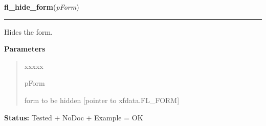     \label{xformslib:library:fl_hide_form}

    \vspace{0.5ex}

\hspace{.8\funcindent}\begin{boxedminipage}{\funcwidth}

    \raggedright \textbf{fl\_hide\_form}(\textit{pForm})

    \vspace{-1.5ex}

    \rule{\textwidth}{0.5\fboxrule}
\setlength{\parskip}{2ex}
    Hides the form.

\setlength{\parskip}{1ex}
      \textbf{Parameters}
      \vspace{-1ex}

      \begin{quote}
        \begin{Ventry}{xxxxx}

          \item[pForm]

          form to be hidden [pointer to xfdata.FL\_FORM]

        \end{Ventry}

      \end{quote}

\textbf{Status:} Tested + NoDoc + Example = OK



    \end{boxedminipage}

    \label{xformslib:library:fl_free_form}

    \vspace{0.5ex}

